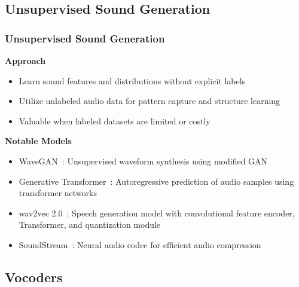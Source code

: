 \subsection{Unsupervised Sound Generation}

\begin{frame}
    \frametitle{Unsupervised Sound Generation}

    \textbf{Approach}
    \begin{itemize}
        \item Learn sound features and distributions without explicit labels
        \item Utilize unlabeled audio data for pattern capture and structure learning
        \item Valuable when labeled datasets are limited or costly
    \end{itemize}

    \textbf{Notable Models}
    \begin{itemize}
        \item WaveGAN~\cite{donahue_adversarial_2019}: Unsupervised waveform synthesis using modified GAN
        \item Generative Transformer~\cite{verma_generative_2021}: Autoregressive prediction of audio samples using transformer networks
        \item wav2vec 2.0~\cite{baevski_wav2vec_2020}: Speech generation model with convolutional feature encoder, Transformer, and quantization module
        \item SoundStream~\cite{zeghidour_soundstream_2021}: Neural audio codec for efficient audio compression
    \end{itemize}
\end{frame}


\subsection{Vocoders}

